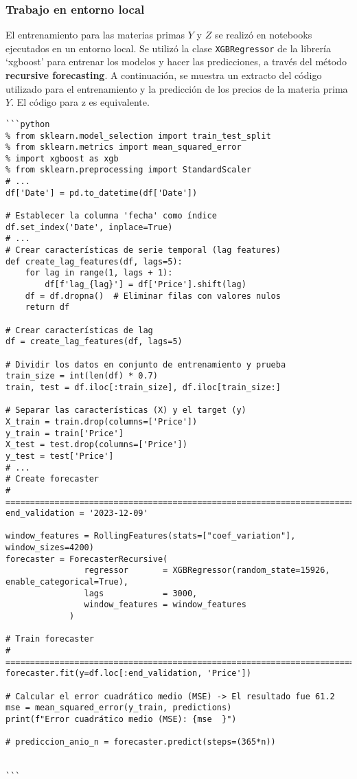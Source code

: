 \subsubsection{Trabajo en entorno local}\label{trabajo-en-entorno-local}

El entrenamiento para las materias primas \(Y\) y \(Z\) se realizó en
notebooks ejecutados en un entorno local. Se utilizó la clase
\texttt{XGBRegressor} de la librería `xgboost' para entrenar los modelos
y hacer las predicciones, a través del método \textbf{recursive
forecasting}. A continuación, se muestra un extracto del código
utilizado para el entrenamiento y la predicción de los precios de la
materia prima \(Y\). El código para z es equivalente.

\begin{verbatim}
```python
% from sklearn.model_selection import train_test_split
% from sklearn.metrics import mean_squared_error
% import xgboost as xgb
% from sklearn.preprocessing import StandardScaler
# ...
df['Date'] = pd.to_datetime(df['Date'])

# Establecer la columna 'fecha' como índice
df.set_index('Date', inplace=True)
# ...
# Crear características de serie temporal (lag features)
def create_lag_features(df, lags=5):
    for lag in range(1, lags + 1):
        df[f'lag_{lag}'] = df['Price'].shift(lag)
    df = df.dropna()  # Eliminar filas con valores nulos
    return df

# Crear características de lag
df = create_lag_features(df, lags=5)

# Dividir los datos en conjunto de entrenamiento y prueba
train_size = int(len(df) * 0.7)
train, test = df.iloc[:train_size], df.iloc[train_size:]

# Separar las características (X) y el target (y)
X_train = train.drop(columns=['Price'])
y_train = train['Price']
X_test = test.drop(columns=['Price'])
y_test = test['Price']
# ...
# Create forecaster
# ==============================================================================
end_validation = '2023-12-09'

window_features = RollingFeatures(stats=["coef_variation"], window_sizes=4200)
forecaster = ForecasterRecursive(
                regressor       = XGBRegressor(random_state=15926, enable_categorical=True),
                lags            = 3000,
                window_features = window_features
             )

# Train forecaster
# ==============================================================================
forecaster.fit(y=df.loc[:end_validation, 'Price'])

# Calcular el error cuadrático medio (MSE) -> El resultado fue 61.2
mse = mean_squared_error(y_train, predictions)
print(f"Error cuadrático medio (MSE): {mse  }")

# prediccion_anio_n = forecaster.predict(steps=(365*n))


```
\end{verbatim}


